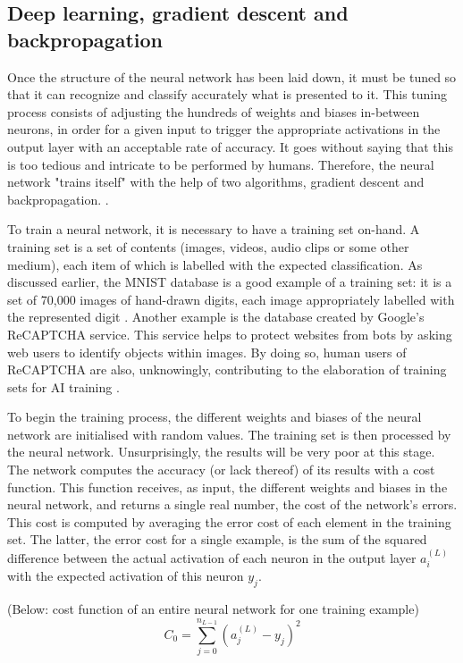 \documentclass[12pt,a4paper,notitlepage]{article}
\begin{document}
\subsection{Deep learning, gradient descent and backpropagation}
Once the structure of the neural network has been laid down, it must be tuned so that it can recognize and classify accurately what is presented to it. This tuning process consists of adjusting the hundreds of weights and biases in-between neurons, in order for a given input to trigger the appropriate activations in the output layer with an acceptable rate of accuracy. It goes without saying that this is too tedious and intricate to be performed by humans. Therefore, the neural network "trains itself" with the help of two algorithms, gradient descent and backpropagation. \cite{ibm_cloud_education_what_2020}.

To train a neural network, it is necessary to have a training set on-hand. A training set is a set of contents (images, videos, audio clips or some other medium), each item of which is labelled with the expected classification. As discussed earlier, the MNIST database is a good example of a training set: it is a set of 70,000 images of hand-drawn digits, each image appropriately labelled with the represented digit \cite{lecun_mnist_1998}. Another example is the database created by Google's ReCAPTCHA service. This service helps to protect websites from bots by asking web users to identify objects within images. By doing so, human users of ReCAPTCHA are also, unknowingly, contributing to the elaboration of training sets for AI training \cite{maruzani_are_2021}.

To begin the training process, the different weights and biases of the neural network are initialised with random values. The training set is then processed by the neural network. Unsurprisingly, the results will be very poor at this stage. The network computes the accuracy (or lack thereof) of its results with a cost function. This function receives, as input, the different weights and biases in the neural network, and returns a single real number, the cost of the network's errors. This cost is computed by averaging the error cost of each element in the training set. The latter, the error cost for a single example, is the sum of the squared difference between the actual activation of each neuron in the output layer \(a_{i}^{(L)}\) with the expected activation of this neuron \(y_j\).

(Below: cost function of an entire neural network for one training example)
\begin{displaymath}
	C_{0} = \sum_{j=0}^{n_{L-1}} (a_{j}^{(L)} - y_{j})^{2}
\end{displaymath}
\end{document}
